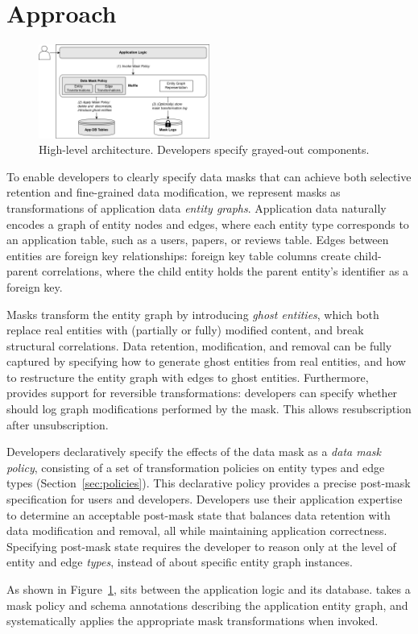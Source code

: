 \section{Approach}

\begin{figure}[t!]
    \centering
    \includegraphics[width=0.5\textwidth]{img/muffle}

    \caption{High-level \sys architecture. Developers specify grayed-out components.}
    \label{fig:arch}
\end{figure}

To enable developers to clearly specify data masks that can achieve both selective retention and
fine-grained data modification, we represent masks as transformations of
application data \emph{entity graphs}. Application data naturally encodes a graph of 
entity nodes and edges, where each entity type corresponds to an application table, such as a users,
papers, or reviews table. Edges between entities are foreign key relationships: foreign key table
columns create child-parent correlations, where the child entity holds the parent entity's
identifier as a foreign key. 

Masks transform the entity graph by introducing \emph{ghost entities}, which both replace real
entities with (partially or fully) modified content, and break structural correlations. Data
retention, modification, and removal can be fully captured by specifying how to generate ghost
entities from real entities, and how to restructure the entity graph with edges to ghost entities.
Furthermore, \sys provides support for reversible transformations: developers can specify whether
\sys should log graph modifications performed by the mask. This allows \eg resubscription after unsubscription.

Developers declaratively specify the effects of the data mask as a \emph{data mask policy},
consisting of a set of transformation policies on entity types and edge types
(Section~\ref{sec:policies}). This declarative policy provides a precise post-mask specification for
users and developers. Developers use their application expertise to determine an acceptable
post-mask state that balances data retention with data modification and removal, all while
maintaining application correctness. Specifying post-mask state requires the developer to reason
only at the level of entity and edge \emph{types}, instead of about specific entity graph instances.

As shown in Figure~\ref{fig:arch}, \sys sits between the application logic and its database. 
\sys takes a mask policy and schema annotations describing the application entity graph,
and systematically applies the appropriate mask transformations when invoked. 
